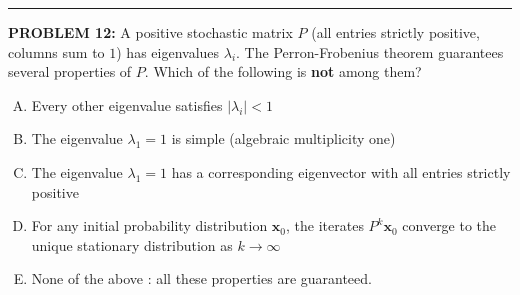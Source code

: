 \documentclass[12pt]{amsart}
\newcommand{\divider}{
  \vspace{-1em} %
  \noindent
  \raisebox{-0.15ex}{\textbullet}%
  \hspace{0.5em}%
  \rule[0.5ex]{0.95\textwidth}{1.0pt}%
  \hspace{0.5em}%
  \raisebox{-0.15ex}{\textbullet}%
  \vspace{0em} %
}
\begin{document}
%
%
%
%
%

\divider

{\bf PROBLEM 12:}
%
A positive stochastic matrix $P$ (all entries strictly positive, columns 
sum to $1$) has eigenvalues $\lambda_i$.
The Perron-Frobenius theorem guarantees several properties of $P$.
Which of the following is \textbf{not} among them?
\vspace{-0.1in}
\begin{enumerate}[(A)]
\item Every other eigenvalue satisfies $|\lambda_i| < 1$
\item The eigenvalue $\lambda_1 = 1$ is simple (algebraic multiplicity 
      one)
\item The eigenvalue $\lambda_1 = 1$ has a corresponding eigenvector 
      with all entries strictly positive
\item For any initial probability distribution $\mathbf{x}_0$, the 
      iterates $P^k\mathbf{x}_0$ converge to the unique stationary 
      distribution as $k \to \infty$
\item None of the above : all these properties are guaranteed.
\end{enumerate}
\end{document}
